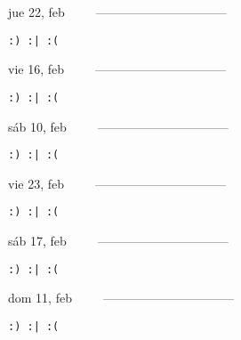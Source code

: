 \documentclass[letterpaper,10pt]{article}
\begin{document}
\begin{multicols}{3}
{jue 22, feb\ \ \ \ \ --------------------------------}
\begin{flushright}\begin{small}\texttt{:) :| :(}\end{small}\end{flushright}
\vfill
{vie 16, feb\ \ \ \ \ --------------------------------}
\begin{flushright}\begin{small}\texttt{:) :| :(}\end{small}\end{flushright}\par
\vfill
{sáb 10, feb\ \ \ \ \ --------------------------------}
\begin{flushright}\begin{small}\texttt{:) :| :(}\end{small}\end{flushright}\par
\vfill
\end{multicols}
\vspace{1.05cm}

\begin{multicols}{3}
{vie 23, feb\ \ \ \ \ --------------------------------}
\begin{flushright}\begin{small}\texttt{:) :| :(}\end{small}\end{flushright}
\vfill
{sáb 17, feb\ \ \ \ \ --------------------------------}
\begin{flushright}\begin{small}\texttt{:) :| :(}\end{small}\end{flushright}\par
\vfill
{dom 11, feb\ \ \ \ \ --------------------------------}
\begin{flushright}\begin{small}\texttt{:) :| :(}\end{small}\end{flushright}\par
\vfill
\end{multicols}
\vspace{1.05cm}
\end{document}
